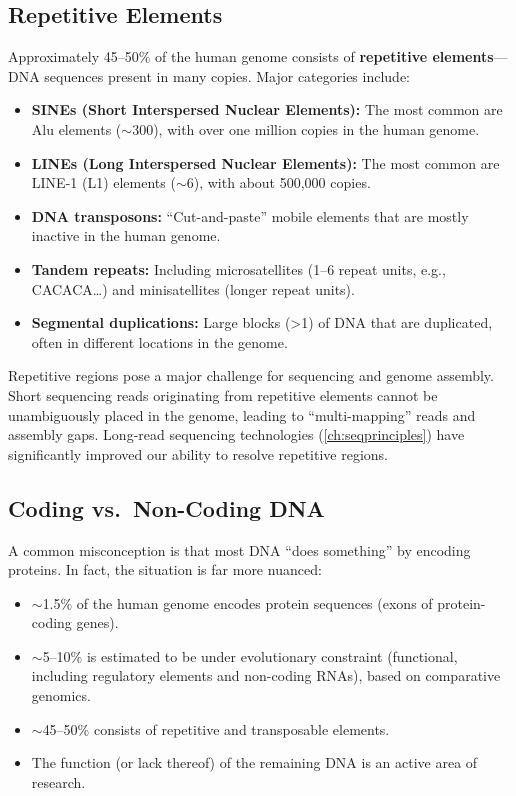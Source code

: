 \subsection{Repetitive Elements}
\label{subsec:molbio:repetitive-elements}

Approximately 45--50\% of the human genome consists of \textbf{repetitive elements}---DNA sequences present in many copies. Major categories include:

\begin{itemize}[itemsep=2pt]
  \item \textbf{SINEs (Short Interspersed Nuclear Elements):} The most common are Alu elements ($\sim$300\basepair{}), with over one million copies in the human genome.
  \item \textbf{LINEs (Long Interspersed Nuclear Elements):} The most common are LINE-1 (L1) elements ($\sim$6\kilobase{}), with about 500,000 copies.
  \item \textbf{DNA transposons:} ``Cut-and-paste'' mobile elements that are mostly inactive in the human genome.
  \item \textbf{Tandem repeats:} Including microsatellites (1--6\basepair{} repeat units, e.g., CACACA\ldots) and minisatellites (longer repeat units).
  \item \textbf{Segmental duplications:} Large blocks (>1\kilobase{}) of DNA that are duplicated, often in different locations in the genome.
\end{itemize}

\begin{warningbox}
Repetitive regions pose a major challenge for sequencing and genome assembly. Short sequencing reads originating from repetitive elements cannot be unambiguously placed in the genome, leading to ``multi-mapping'' reads and assembly gaps. Long-read sequencing technologies (\cref{ch:seqprinciples}) have significantly improved our ability to resolve repetitive regions.
\end{warningbox}

\subsection{Coding vs.\ Non-Coding DNA}
\label{subsec:molbio:coding-noncoding}

A common misconception is that most DNA ``does something'' by encoding proteins. In fact, the situation is far more nuanced:

\begin{itemize}[itemsep=2pt]
  \item $\sim$1.5\% of the human genome encodes protein sequences (exons of protein-coding genes).
  \item $\sim$5--10\% is estimated to be under evolutionary constraint (functional, including regulatory elements and non-coding RNAs), based on comparative genomics.
  \item $\sim$45--50\% consists of repetitive and transposable elements.
  \item The function (or lack thereof) of the remaining DNA is an active area of research.
\end{itemize}


